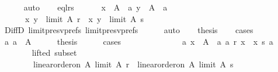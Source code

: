 \begin{isabellebody}
\ \ \ \ \isamarkupfalse%
\ auto\isanewline
\ \ \isamarkupfalse%
\ eql{\isacharunderscore}{\kern0pt}rs{\isacharcolon}{\kern0pt}\isanewline
\ \ \ \ \ \ {\isachardoublequoteopen}{\isasymforall}x\ {\isasymin}\ A\ {\isacharminus}{\kern0pt}\ {\isacharbraceleft}{\kern0pt}a{\isacharbraceright}{\kern0pt}{\isachardot}{\kern0pt}\ {\isasymforall}y\ {\isasymin}\ A\ {\isacharminus}{\kern0pt}\ {\isacharbraceleft}{\kern0pt}a{\isacharbraceright}{\kern0pt}{\isachardot}{\kern0pt}\isanewline
\ \ \ \ \ \ {\isacharparenleft}{\kern0pt}x{\isacharcomma}{\kern0pt}\ y{\isacharparenright}{\kern0pt}\ {\isasymin}\ {\isacharparenleft}{\kern0pt}limit\ A\ r{\isacharparenright}{\kern0pt}\ {\isasymlongleftrightarrow}\ {\isacharparenleft}{\kern0pt}x{\isacharcomma}{\kern0pt}\ y{\isacharparenright}{\kern0pt}\ {\isasymin}\ {\isacharparenleft}{\kern0pt}limit\ A\ s{\isacharparenright}{\kern0pt}{\isachardoublequoteclose}\isanewline
\ \ \ \ \isamarkupfalse%
\ DiffD{}\ limit{\isacharunderscore}{\kern0pt}presv{\isacharunderscore}{\kern0pt}prefs{}\ limit{\isacharunderscore}{\kern0pt}presv{\isacharunderscore}{\kern0pt}prefs{}\isanewline
\ \ \ \ \isamarkupfalse%
\ auto\isanewline
\ \ \isamarkupfalse%
\ {\isacharquery}{\kern0pt}thesis\isanewline
\ \ \isamarkupfalse%
\ cases\isanewline
\ \ \ \ \isamarkupfalse%
\ a{}{\isacharcolon}{\kern0pt}\ {\isachardoublequoteopen}a\ {\isasymin}\ A{\isachardoublequoteclose}\isanewline
\ \ \ \ \isamarkupfalse%
\ {\isacharquery}{\kern0pt}thesis\isanewline
\ \ \ \ \isamarkupfalse%
\ cases\isanewline
\ \ \ \ \ \ \isanewline
\ \ \ \ \ \ \isamarkupfalse%
\ a{}{\isacharunderscore}{\kern0pt}{}{\isacharcolon}{\kern0pt}\ {\isachardoublequoteopen}{\isasymexists}x\ {\isasymin}\ A\ {\isacharminus}{\kern0pt}\ {\isacharbraceleft}{\kern0pt}a{\isacharbraceright}{\kern0pt}{\isachardot}{\kern0pt}\ a\ {\isasympreceq}\isactrlsub r\ x\ {\isasymand}\ x\ {\isasympreceq}\isactrlsub s\ a{\isachardoublequoteclose}\ \isanewline
\ \ \ \ \ \ \isamarkupfalse%
\ lifted\ subset\ \isamarkupfalse%
\isanewline
\ \ \ \ \ \ \ \ {\isachardoublequoteopen}linear{\isacharunderscore}{\kern0pt}order{\isacharunderscore}{\kern0pt}on\ A\ {\isacharparenleft}{\kern0pt}limit\ A\ r{\isacharparenright}{\kern0pt}\ {\isasymand}\ linear{\isacharunderscore}{\kern0pt}order{\isacharunderscore}{\kern0pt}on\ A\ {\isacharparenleft}{\kern0pt}limit\ A\ s{\isacharparenright}{\kern0pt}{\isachardoublequoteclose}\isanewline

\end{isabellebody}
